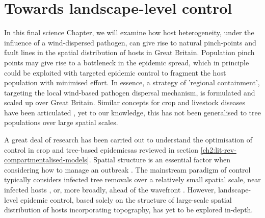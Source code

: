 
\chapter{Towards landscape-level control}


\label{ch7:landscape-level-control}

In this final science Chapter, we will examine how host heterogeneity, under the influence of a wind-dispersed pathogen, 
can give rise to natural pinch-points and fault lines in the spatial distribution of hosts in Great Britain. 
Population pinch points may give rise to a bottleneck in the epidemic spread, which in principle could be exploited with targeted epidemic control to fragment the host population with minimised effort. 
In essence, a strategy of 'regional containment', targeting the local wind-based pathogen dispersal mechanism, 
is formulated and scaled up over Great Britain.
Similar concepts for crop and livestock diseases have been articulated \cite{PAPAIX201435, GILIOLI20131, Gilligan-disease-management}, yet to our knowledge, this has not been generalised to tree populations over large spatial scales.

A great deal of research has been carried out to understand the optimisation of control in crop and tree-based epidemics\textemdash as reviewed in section \ref{ch2:lit-rev-compartmentalised-models}. 
Spatial structure is an essential factor when considering how to manage an outbreak \cite{spatial-control-optimisation, control-heterogeneous-landscapes}. 
The mainstream paradigm of control typically considers infected tree removals over a relatively small spatial scale, near infected hosts \cite{WEBIDEMICS}, or, more broadly, ahead of the wavefront \cite{large-scale-control}. 
However, landscape-level epidemic control, based solely on the structure of large-scale spatial distribution of hosts incorporating topography, has yet to be explored in-depth.

